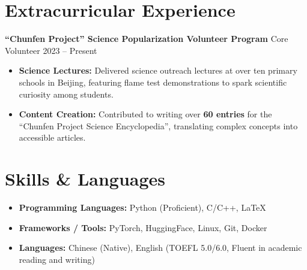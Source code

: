 \documentclass[11pt,a4paper]{article}
\begin{document}
\section{Extracurricular Experience}
\textbf{``Chunfen Project'' Science Popularization Volunteer Program} \hfill Core Volunteer \hfill 2023 -- Present
\begin{itemize}
    \item \textbf{Science Lectures:} Delivered science outreach lectures at over ten primary schools in Beijing, featuring flame test demonstrations to spark scientific curiosity among students.
    \item \textbf{Content Creation:} Contributed to writing over \textbf{60 entries} for the ``Chunfen Project Science Encyclopedia'', translating complex concepts into accessible articles.
\end{itemize}

\section{Skills \& Languages}
\begin{itemize}
    \item \textbf{Programming Languages:} Python (Proficient), C/C++, LaTeX
    \item \textbf{Frameworks / Tools:} PyTorch, HuggingFace, Linux, Git, Docker
    \item \textbf{Languages:} Chinese (Native), English (TOEFL 5.0/6.0, Fluent in academic reading and writing)
\end{itemize}
\end{document}
